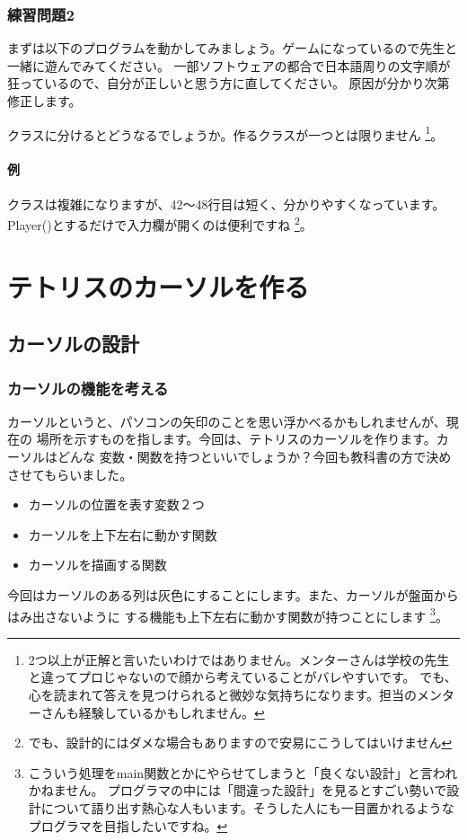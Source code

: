 \documentclass[12pt, a4paper, dvipdfmx]{book}
\begin{document}
\subsection{練習問題2}
まずは以下のプログラムを動かしてみましょう。ゲームになっているので先生と一緒に遊んでみてください。
一部ソフトウェアの都合で日本語周りの文字順が狂っているので、自分が正しいと思う方に直してください。
原因が分かり次第修正します。

クラスに分けるとどうなるでしょうか。作るクラスが一つとは限りません
\footnote{2つ以上が正解と言いたいわけではありません。メンターさんは学校の先生と違ってプロじゃないので顔から考えていることがバレやすいです。
  でも、心を読まれて答えを見つけられると微妙な気持ちになります。担当のメンターさんも経験しているかもしれません。}。

\newpage
\subsubsection{例}

クラスは複雑になりますが、42〜48行目は短く、分かりやすくなっています。Player()とするだけで入力欄が開くのは便利ですね
\footnote{でも、設計的にはダメな場合もありますので安易にこうしてはいけません}。

\chapter{テトリスのカーソルを作る}
\section{カーソルの設計}
\subsection{カーソルの機能を考える}
カーソルというと、パソコンの矢印のことを思い浮かべるかもしれませんが、現在の
場所を示すものを指します。今回は、テトリスのカーソルを作ります。カーソルはどんな
変数・関数を持つといいでしょうか？今回も教科書の方で決めさせてもらいました。
\begin{itemize}
  \item カーソルの位置を表す変数２つ
  \item カーソルを上下左右に動かす関数
  \item カーソルを描画する関数
\end{itemize}
今回はカーソルのある列は灰色にすることにします。また、カーソルが盤面からはみ出さないように
する機能も上下左右に動かす関数が持つことにします
\footnote{こういう処理をmain関数とかにやらせてしまうと「良くない設計」と言われかねません。
  プログラマの中には「間違った設計」を見るとすごい勢いで設計について語り出す熱心な人もいます。そうした人にも一目置かれるようなプログラマを目指したいですね。}。
\end{document}
